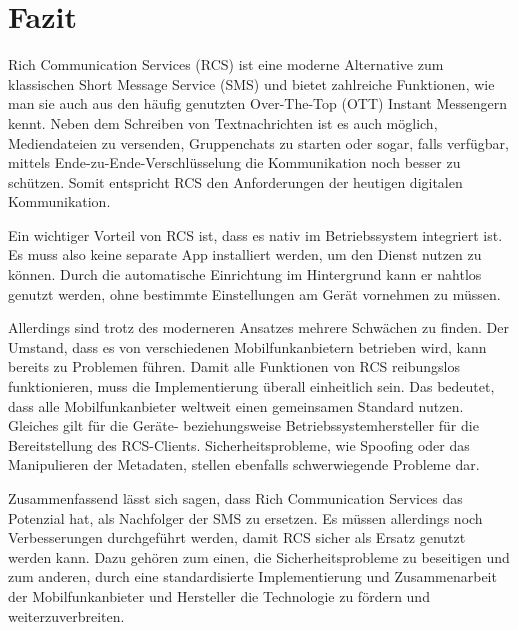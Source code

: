 \documentclass[conference]{IEEEtran}
\begin{document}
\section{Fazit}

Rich Communication Services (RCS) ist eine moderne Alternative zum klassischen Short Message Service (SMS) und bietet zahlreiche Funktionen, wie man sie auch aus den häufig genutzten Over-The-Top (OTT) Instant Messengern kennt.
Neben dem Schreiben von Textnachrichten ist es auch möglich, Mediendateien zu versenden, Gruppenchats zu starten oder sogar, falls verfügbar, mittels Ende-zu-Ende-Verschlüsselung die Kommunikation noch besser zu schützen.
Somit entspricht RCS den Anforderungen der heutigen digitalen Kommunikation.

Ein wichtiger Vorteil von RCS ist, dass es nativ im Betriebssystem integriert ist.
Es muss also keine separate App installiert werden, um den Dienst nutzen zu können.
Durch die automatische Einrichtung im Hintergrund kann er nahtlos genutzt werden, ohne bestimmte Einstellungen am Gerät vornehmen zu müssen.

Allerdings sind trotz des moderneren Ansatzes mehrere Schwächen zu finden.
Der Umstand, dass es von verschiedenen Mobilfunkanbietern betrieben wird, kann bereits zu Problemen führen.
Damit alle Funktionen von RCS reibungslos funktionieren, muss die Implementierung überall einheitlich sein.
Das bedeutet, dass alle Mobilfunkanbieter weltweit einen gemeinsamen Standard nutzen.
Gleiches gilt für die Geräte- beziehungsweise Betriebssystemhersteller für die Bereitstellung des RCS-Clients.
Sicherheitsprobleme, wie Spoofing oder das Manipulieren der Metadaten, stellen ebenfalls schwerwiegende Probleme dar.

Zusammenfassend lässt sich sagen, dass Rich Communication Services das Potenzial hat, als Nachfolger der SMS zu ersetzen.
Es müssen allerdings noch Verbesserungen durchgeführt werden, damit RCS sicher als Ersatz genutzt werden kann.
Dazu gehören zum einen, die Sicherheitsprobleme zu beseitigen und zum anderen, durch eine standardisierte Implementierung und Zusammenarbeit der Mobilfunkanbieter und Hersteller die Technologie zu fördern und weiterzuverbreiten.




\end{document}
